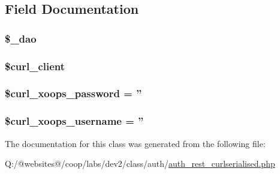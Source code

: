 \subsection{Field Documentation}
\hypertarget{class_xortify_auth_rest___curlserialised_a12a029c610f699b4b25e79a1f64a3485}{
\subsubsection[{\$\-\_\-dao}]{\setlength{\rightskip}{0pt plus 5cm}\$\-\_\-dao}}\label{class_xortify_auth_rest___curlserialised_a12a029c610f699b4b25e79a1f64a3485}
\hypertarget{class_xortify_auth_rest___curlserialised_a402f2112991f3227835af80e9df33e38}{
\subsubsection[{\$curl\-\_\-client}]{\setlength{\rightskip}{0pt plus 5cm}\$curl\-\_\-client}}\label{class_xortify_auth_rest___curlserialised_a402f2112991f3227835af80e9df33e38}
\hypertarget{class_xortify_auth_rest___curlserialised_a6c9851541ed3826c67cfe7224c38f0b8}{
\subsubsection[{\$curl\-\_\-xoops\-\_\-password}]{\setlength{\rightskip}{0pt plus 5cm}\$curl\-\_\-xoops\-\_\-password = ''}}\label{class_xortify_auth_rest___curlserialised_a6c9851541ed3826c67cfe7224c38f0b8}
\hypertarget{class_xortify_auth_rest___curlserialised_aab7480ba9f878a02b2c9fd43922fa070}{
\subsubsection[{\$curl\-\_\-xoops\-\_\-username}]{\setlength{\rightskip}{0pt plus 5cm}\$curl\-\_\-xoops\-\_\-username = ''}}\label{class_xortify_auth_rest___curlserialised_aab7480ba9f878a02b2c9fd43922fa070}


The documentation for this class was generated from the following file\-:\begin{DoxyCompactItemize}
\item 
Q\-:/@websites@/coop/labs/dev2/class/auth/\hyperlink{auth__rest__curlserialised_8php}{auth\-\_\-rest\-\_\-curlserialised.\-php}\end{DoxyCompactItemize}
